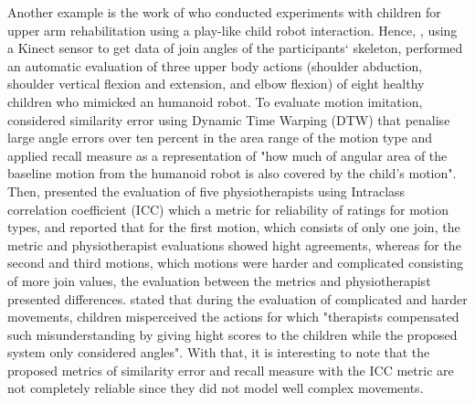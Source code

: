 
Another example is the work of \cite{guneysu2014} who conducted experiments 
with children for upper 
arm rehabilitation using a play-like child robot interaction.
Hence, \cite{guneysu2014}, using a Kinect sensor to get data of join angles of 
the participants` skeleton, performed an automatic evaluation of three 
upper body actions (shoulder abduction, shoulder vertical flexion and 
extension, and elbow flexion) of eight healthy children who mimicked an 
humanoid robot. To evaluate motion imitation, \citealt[p. 202]{guneysu2014} 
considered similarity error using Dynamic Time Warping (DTW) that 
penalise large angle errors over ten percent in the area range of the 
motion type and applied recall measure as a representation of 
"how much of angular area of the baseline motion
from the humanoid robot is also covered by the child's motion".
Then, \cite{guneysu2014} presented the evaluation of five physiotherapists 
using Intraclass correlation coefficient (ICC) which a metric for 
reliability of ratings for motion types, and reported that for the 
first motion, which consists of only one join, the metric and 
physiotherapist evaluations showed hight agreements, whereas for the 
second and third motions, which motions were harder and complicated 
consisting of more join values, the evaluation between the metrics 
and physiotherapist presented differences.
\citealt[p. 203]{guneysu2014} stated that during the evaluation of complicated 
and harder movements, children misperceived the actions for which "therapists
compensated such misunderstanding by giving hight scores to the children
while the proposed system only considered angles".
With that, it is interesting to note that the proposed metrics of similarity 
error and recall measure with the ICC metric are not completely reliable since 
they did not model well complex movements.
